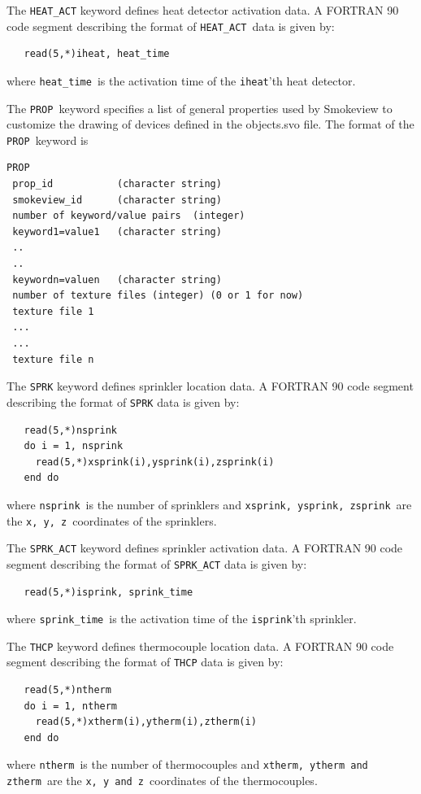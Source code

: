 \documentclass[11pt,twoside]{book}
\newcommand{\hitem}[1]{\item[{\bf #1} \hfill]}
\begin{document}
\hitem{HEAT\_ACT}The {\tt HEAT\_ACT} keyword defines heat detector activation data.
A FORTRAN 90 code segment describing the format of {\tt HEAT\_ACT}\ data is given by:
\begin{verbatim}
   read(5,*)iheat, heat_time
\end{verbatim}
where {\tt heat\_time}\ is the activation time of the {\tt iheat}'th heat
detector.

\hitem{PROP}The {\tt PROP}\ keyword specifies
a list of general properties used
by Smokeview to customize the drawing of devices defined in
the objects.svo file.
The format of the {\tt PROP}\ keyword is

\begin{verbatim}
PROP
 prop_id           (character string)
 smokeview_id      (character string)
 number of keyword/value pairs  (integer)
 keyword1=value1   (character string)
 ..
 ..
 keywordn=valuen   (character string)
 number of texture files (integer) (0 or 1 for now)
 texture file 1
 ...
 ...
 texture file n
\end{verbatim}

\hitem{SPRK}The {\tt SPRK} keyword defines sprinkler location data.
A FORTRAN 90 code segment describing the format of {\tt SPRK} data is given by:
\begin{verbatim}
   read(5,*)nsprink
   do i = 1, nsprink
     read(5,*)xsprink(i),ysprink(i),zsprink(i)
   end do
\end{verbatim}
where {\tt nsprink}\ is the number of sprinklers and
{\tt xsprink, ysprink, zsprink}\ are the {\tt x, y, z}\
coordinates of the sprinklers.

\hitem{SPRK\_ACT}The {\tt SPRK\_ACT} keyword defines sprinkler activation data.
A FORTRAN 90 code segment describing the format of {\tt SPRK\_ACT} data is given by:
\begin{verbatim}
   read(5,*)isprink, sprink_time
\end{verbatim}
where {\tt sprink\_time}\ is the activation time of the {\tt isprink}'th sprinkler.

\hitem{THCP}The {\tt THCP} keyword defines thermocouple location data.
A FORTRAN 90 code segment describing the format of {\tt THCP} data is given by:
\begin{verbatim}
   read(5,*)ntherm
   do i = 1, ntherm
     read(5,*)xtherm(i),ytherm(i),ztherm(i)
   end do
\end{verbatim}
where {\tt ntherm}\ is the number of thermocouples and
{\tt xtherm, ytherm and ztherm}\ are the {\tt x, y and z}\
coordinates of the thermocouples.
\end{document}
